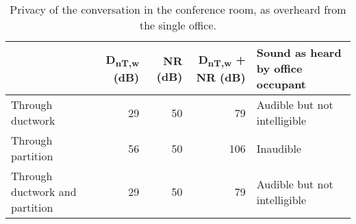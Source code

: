 \begin{table}[htbp]
	\caption{Privacy of the conversation in the conference room, as overheard from the single office.}
	\label{tbl:privacy}
	\centering
	\begin{tabular}{@{}lrrrl@{}}
		\toprule
		& D\textsubscript{nT,w} (dB) & NR (dB) & D\textsubscript{nT,w} + NR (dB) & Sound as heard by office occupant \\ \midrule
		Through ductwork & 29 & 50 & 79 & Audible but not intelligible \\
		Through partition & 56 & 50 & 106 & Inaudible \\
		Through ductwork and partition & 29 & 50 & 79 & Audible but not intelligible \\ \bottomrule
	\end{tabular}
\end{table}